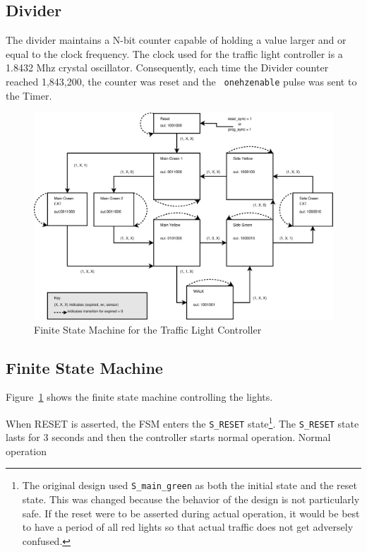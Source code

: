 \documentclass{article}
\begin{document}
	\subsection{Divider}
		The divider maintains a N-bit counter capable of holding a
		value larger and or equal to the clock frequency.  The clock
		used for the traffic light controller is a 1.8432 Mhz crystal
		oscillator.  Consequently, each time the Divider counter
		reached 1,843,200, the counter was reset and the {\texttt{
		onehzenable}} pulse was sent to the Timer.

	\begin{figure}
	\centering
	\includegraphics{fsm.ps}
	\caption{Finite State Machine for the Traffic Light Controller}
	\label{fig:fsm}
	\end{figure}

	\subsection{Finite State Machine}
		Figure~\ref{fig:fsm} shows the finite state machine controlling
		the lights.

		When RESET is asserted, the FSM enters the \texttt{S\_RESET}
		state\footnote{The original design used \texttt{S\_main\_green} as both
		the initial state and the reset state.  This was changed because the
		behavior of the design is not particularly safe.  If the reset were to
		be asserted during actual operation, it would be best to have a period
		of all red lights so that actual traffic does not get adversely
		confused.}.  The \texttt{S\_RESET} state lasts for 3 seconds and then
		the controller starts normal operation.  Normal operation 
	
\end{document}
